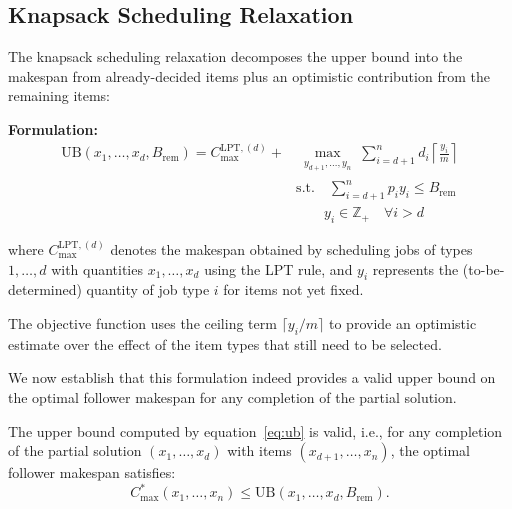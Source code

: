 \subsection{Knapsack Scheduling Relaxation}

The knapsack scheduling relaxation decomposes the upper bound into the makespan from already-decided items plus an optimistic contribution from the remaining items:

\textbf{Formulation:}
\begin{align}
\text{UB}(x_1, \ldots, x_d, B_{\text{rem}}) = C_{\max}^{\text{LPT},(d)} + & \max_{\substack{y_{d+1}, \ldots, y_n}} \sum_{i=d+1}^{n} d_i \left\lceil \frac{y_i}{m} \right\rceil \label{eq:ub}\\
& \text{s.t.} \quad \sum_{i=d+1}^{n} p_i y_i \leq B_{\text{rem}} \nonumber\\
& \quad \quad y_i \in \mathbb{Z}_+ \quad \forall i > d \nonumber
\end{align}

where $C_{\max}^{\text{LPT},(d)}$ denotes the makespan obtained by scheduling jobs of types $1, \ldots, d$ with quantities $x_1, \ldots, x_d$ using the LPT rule, and $y_i$ represents the (to-be-determined) quantity of job type $i$ for items not yet fixed.

The objective function uses the ceiling term $\lceil y_i / m \rceil$ to provide an optimistic estimate over the effect of the item types that still need to be selected.

We now establish that this formulation indeed provides a valid upper bound on the optimal follower makespan for any completion of the partial solution.

\begin{theorem}
\label{thm:upper-bound}
The upper bound computed by equation~\eqref{eq:ub} is valid, i.e., for any completion of the partial solution $(x_1, \ldots, x_d)$ with items $(x_{d+1}, \ldots, x_n)$, the optimal follower makespan satisfies:
\begin{equation}
C_{\max}^*(x_1, \ldots, x_n) \leq \text{UB}(x_1, \ldots, x_d, B_{\text{rem}}).
\end{equation}
\end{theorem}

